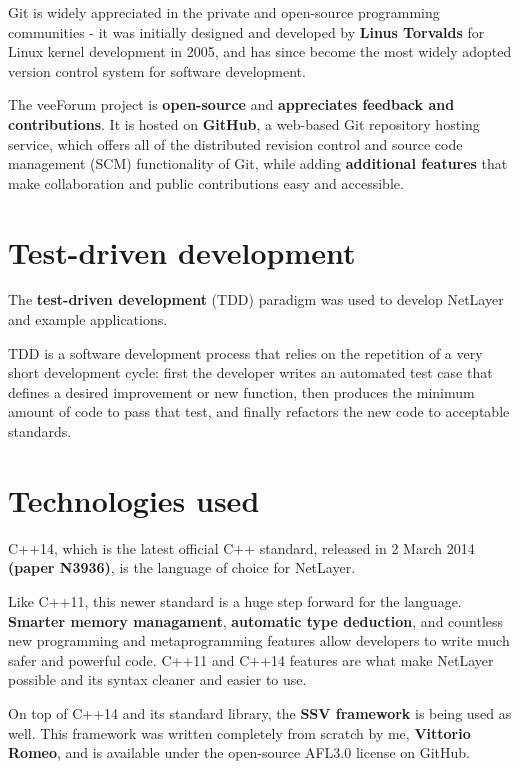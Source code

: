 \documentclass[12pt]{report}
\newcommand{\+}{\discretionary{\mbox{\scriptsize$\hookleftarrow$}}{}{}}
\renewcommand\emph{\textbf}
\begin{document}
                Git is widely appreciated in the private and open-source programming communities - it was initially designed and developed by \emph{Linus Torvalds} for Linux kernel development in 2005, and has since become the most widely adopted version control system for software development.

                The veeForum project is \emph{open-source} and \emph{appreciates feedback and contributions}. It is hosted on \emph{GitHub}, a web-based Git repository hosting service, which offers all of the distributed revision control and source code management (SCM) functionality of Git, while adding \emph{additional features} that make collaboration and public contributions easy and accessible.

            \section{Test-driven development}
                The \emph{test-driven development} (TDD) paradigm was used to develop NetLayer and example applications. 

                TDD is a software development process that relies on the repetition of a very short development cycle: first the developer writes an automated test case that defines a desired improvement or new function, then produces the minimum amount of code to pass that test, and finally refactors the new code to acceptable standards.

            \section{Technologies used}
                C++14, which is the latest official C++ standard, released in 2 March 2014 \emph{(paper N3936)}, is the language of choice for NetLayer.
                
                Like C++11, this newer standard is a huge step forward for the language. \emph{Smarter memory managament}, \emph{automatic type deduction}, and countless new programming and metaprogramming features allow developers to write much safer and powerful code.
                C++11 and C++14 features are what make NetLayer possible and its syntax cleaner and easier to use.

                On top of C++14 and its standard library, the \emph{SSV framework} is being used as well. This framework was written completely from scratch by me, \emph{Vittorio Romeo}, and is available under the open-source AFL3.0 license on GitHub.
\end{document}
